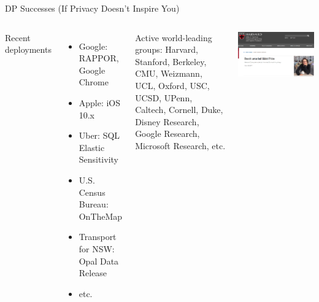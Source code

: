 \documentclass{beamer}
\begin{document}
\begin{frame}{DP Successes (If Privacy Doesn't Inspire You)}
\begin{columns}[T,onlytextwidth]
Recent deployments
\begin{itemize}
\item Google: RAPPOR,\\ Google Chrome
\item Apple: iOS 10.x
\item Uber: SQL Elastic Sensitivity
\item U.S. Census Bureau: OnTheMap
\item Transport for NSW: \\ Opal Data Release
\item etc.
\end{itemize}
Active world-leading groups: Harvard, Stanford, Berkeley, CMU, Weizmann, UCL, Oxford, USC, UCSD, UPenn, Caltech, Cornell, Duke, Disney Research, Google Research, Microsoft Research, etc. \\

\begin{center}\includegraphics[width=0.90\columnwidth]{figures/news-godel}\end{center}
\end{columns}
\end{frame}
\end{document}
